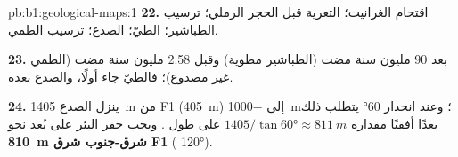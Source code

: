 \begin{solution}{pb:b1:geological-maps:1}
\textbf{22.} اقتحام الغرانيت؛ التعرية قبل الحجر الرملي؛ ترسيب الطباشير؛ الطيّ؛ الصدع؛ ترسيب الطمي.

\textbf{23.} بعد 90 مليون سنة مضت (الطباشير مطوية) وقبل 2.58 مليون سنة مضت (الطمي غير مصدوع)؛ فالطيّ جاء أولًا، والصدع بعده.

\textbf{24.} ينزل الصدع \qty{1405}{m} من F1 (\qty{405}{m}) إلى
\qty{-1000}{m}؛ وعند انحدار \ang{60} يتطلب ذلك بعدًا أفقيًا مقداره
$1405/\tan\ang{60} \approx \qty{811}{m}$ على طول . ويجب حفر البئر على بُعد نحو \textbf{\qty[text-series-to-math=true]{810}{m} شرق-جنوب شرق F1} ( \ang{120}).
\end{solution}
